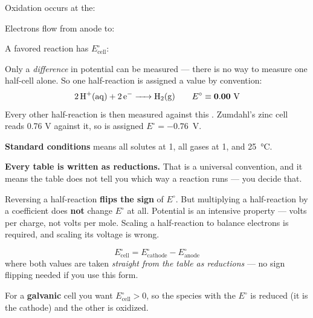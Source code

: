 \documentclass{apchem-notes}
\begin{document}

\begin{warmup}[3]
  \item Oxidation occurs at the: 
  \item Electrons flow from anode to:
  \item A favored reaction has $E^\circ_{\text{cell}}$:
\end{warmup}



Only a \emph{difference} in potential can be measured --- there is no way to
measure one half-cell alone. So one half-reaction is assigned a value by
convention:
\[ \ce{2H+(aq) + 2e^- -> H2(g)} \qquad E^\circ \equiv
   \mathbf{0.00}~\text{V} \]
Every other half-reaction is then measured against this
. Zumdahl's zinc cell reads 0.76 V against
it, so  is assigned $E^\circ = -0.76$~V.

\textbf{Standard conditions} means all solutes at \SI{1}{\Molar}, all gases
at \SI{1}{\atm}, and \SI{25}{\celsius}.

\begin{apctrap}
\textbf{Every table is written as reductions.} That is a universal
convention, and it means the table does not tell you which way a reaction
runs --- you decide that.

Reversing a half-reaction \textbf{flips the sign} of $E^\circ$. But
multiplying a half-reaction by a coefficient does \textbf{not} change
$E^\circ$ at all. Potential is an intensive property --- volts per charge,
not volts per mole. Scaling a half-reaction to balance electrons is
required, and scaling its voltage is wrong.
\end{apctrap}


\[ \boxed{\;E^\circ_{\text{cell}} = E^\circ_{\text{cathode}}
   - E^\circ_{\text{anode}}\;} \]
where both values are taken \emph{straight from the table as reductions} ---
no sign flipping needed if you use this form.

For a \textbf{galvanic} cell you want $E^\circ_{\text{cell}} > 0$, so the
species with the  $E^\circ$ is reduced (it
is the cathode) and the other is oxidized.
\end{document}
